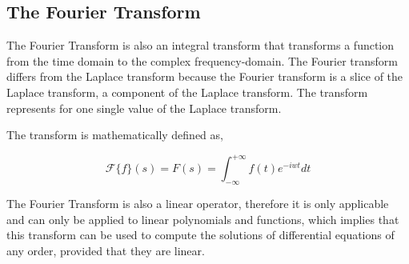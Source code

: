 

\subsection{{The Fourier Transform}}

	{The Fourier Transform is also an integral transform that transforms a function from the time domain to the complex frequency-domain. The Fourier transform differs from the Laplace transform because the Fourier transform is a slice of the Laplace transform, a component of the Laplace transform. The transform represents for one single value of the Laplace transform.}

	{The transform is mathematically defined as,}

		$$\mathcal{F}\{f\}(s) = F(s) = \int_{-\infty}^{+\infty}f(t)e^{-iwt} dt$$

	{The Fourier Transform is also a linear operator, therefore it is only applicable and can only be applied to linear polynomials and functions, which implies that this transform can be used to compute the solutions of differential equations of any order, provided that they are linear.}

